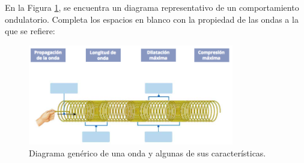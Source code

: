 \question[5] En la Figura \ref{fig:onda_resorte}, se encuentra un diagrama representativo de un comportamiento ondulatorio. Completa los espacios en blanco con la propiedad de las ondas a la que se refiere:
    \begin{figure}[H]
        \centering
        \includegraphics[width =0.8\textwidth ]{Images/onda_resorte.png}
        \caption{Diagrama gen\'erico de una onda y algunas de sus caracter\'isticas.}
        \label{fig:onda_resorte}
    \end{figure}